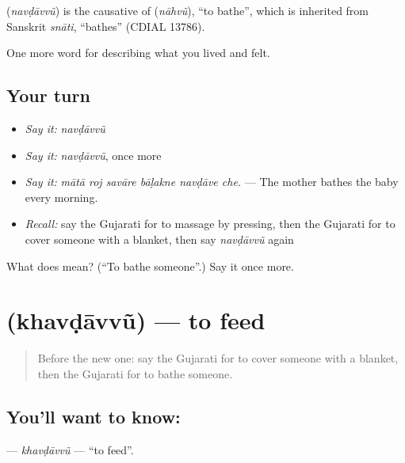 \begin{cousinweb}
\textbf{} (\emph{navḍāvvũ}) is the causative of \textbf{} (\emph{nāhvũ}), \textquotedblleft{}to bathe\textquotedblright{}, which is inherited from Sanskrit \emph{snāti}, \textquotedblleft{}bathes\textquotedblright{} (CDIAL 13786).
\end{cousinweb}

\begin{grammarlens}[title={What you've built}]
One more word for describing what you lived and felt.
\end{grammarlens}

\subsection*{Your turn}
\begin{itemize}
\raggedright
  \item \emph{Say it:} \emph{navḍāvvũ}
  \item \emph{Say it:} \emph{navḍāvvũ}, once more
  \item \emph{Say it:} \emph{mātā roj savāre bāḷakne navḍāve che.} — The mother bathes the baby every morning.
  \item \emph{Recall:} say the Gujarati for to massage by pressing, then the Gujarati for to cover someone with a blanket, then say \emph{navḍāvvũ} again
\end{itemize}

\begin{tcolorbox}[breakable,colback=teal!4,colframe=teal!35!black,title={Before you move on}]
What does  mean? (\textquotedblleft{}To bathe someone\textquotedblright{}.) Say it once more.
\end{tcolorbox}
\section[\texorpdfstring{\gu{ખવડાવવું} (khavḍāvvũ)}{ખવડાવવું (khavḍāvvũ)}]{ (khavḍāvvũ) — to feed}

\label{lesson:GU-C488-khavdavvu}



\begin{quote}
Before the new one: say the Gujarati for to cover someone with a blanket, then the Gujarati for to bathe someone.
\end{quote}

\subsection*{You'll want to know: }
\textbf{} — \emph{khavḍāvvũ} — \textquotedblleft{}to feed\textquotedblright{}.

